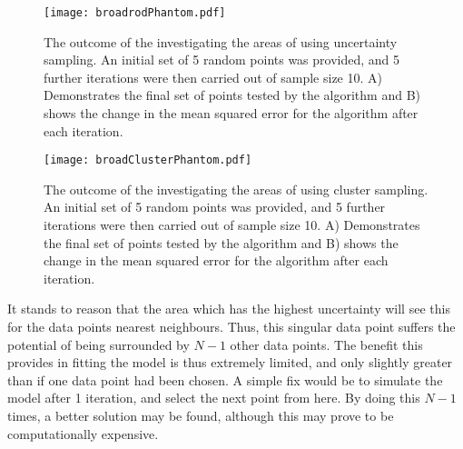 \begin{figure}[H]
    \begin{center}
        \texttt{[image: broadrodPhantom.pdf]}
        \caption[Batch Uncertainty Sampling]{The outcome of the investigating the areas of using uncertainty sampling. An initial set of 5 random points was provided, and 5 further iterations were then carried out of sample size 10. A) Demonstrates the final set of points tested by the algorithm and B) shows the change in the mean squared error for the algorithm after each iteration.}
    \end{center}
\end{figure}


\begin{figure}[H]
    \begin{center}
        \texttt{[image: broadClusterPhantom.pdf]}
        \caption[Batch Cluster Sampling]{The outcome of the investigating the areas of using cluster sampling. An initial set of 5 random points was provided, and 5 further iterations were then carried out of sample size 10. A) Demonstrates the final set of points tested by the algorithm and B) shows the change in the mean squared error for the algorithm after each iteration.}
    \end{center}
\end{figure}


It stands to reason that the area which has the highest uncertainty will see this for the data points nearest neighbours. Thus, this singular data point suffers the potential of being surrounded by $N-1$ other data points. The benefit this provides in fitting the model is thus extremely limited, and only slightly greater than if one data point had been chosen. A simple fix would be to simulate the model after 1 iteration, and select the next point from here. By doing this $N-1$ times, a better solution may be found, although this may prove to be computationally expensive.

